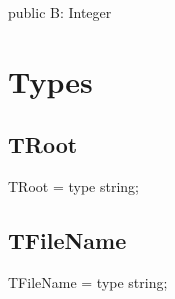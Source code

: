 \documentclass{report}
\begin{document}
\begin{list}{}{
\setlength{\itemindent}{0cm}
\setlength{\listparindent}{0cm}
\setlength{\leftmargin}{\evensidemargin}
\addtolength{\leftmargin}{\tmplength}
\settowidth{\labelsep}{X}
\addtolength{\leftmargin}{\labelsep}
\setlength{\labelwidth}{\tmplength}
}
\begin{flushleft}
\item[\textbf{Declaration}\hfill]
\begin{ttfamily}
public B: Integer \end{ttfamily}


\end{flushleft}
\end{list}
\section{Types}
\subsection*{TRoot}
\begin{list}{}{
\setlength{\itemindent}{0cm}
\setlength{\listparindent}{0cm}
\setlength{\leftmargin}{\evensidemargin}
\addtolength{\leftmargin}{\tmplength}
\settowidth{\labelsep}{X}
\addtolength{\leftmargin}{\labelsep}
\setlength{\labelwidth}{\tmplength}
}
\begin{flushleft}
\item[\textbf{Declaration}\hfill]
\begin{ttfamily}
TRoot = type string;\end{ttfamily}


\end{flushleft}
\end{list}
\subsection*{TFileName}
\begin{list}{}{
\setlength{\itemindent}{0cm}
\setlength{\listparindent}{0cm}
\setlength{\leftmargin}{\evensidemargin}
\addtolength{\leftmargin}{\tmplength}
\settowidth{\labelsep}{X}
\addtolength{\leftmargin}{\labelsep}
\setlength{\labelwidth}{\tmplength}
}
\begin{flushleft}
\item[\textbf{Declaration}\hfill]
\begin{ttfamily}
TFileName = type string;\end{ttfamily}


\end{flushleft}
\end{list}
\end{document}
